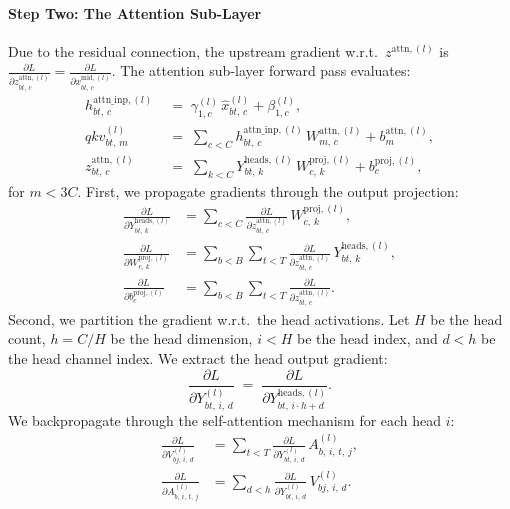 \documentclass[letterpaper, 10 pt, conference]{ieeeconf}
\newcommand{\pdv}[2]{\frac{\partial #1}{\partial #2}}
\newcommand{\dL}[1]{\pdv{L}{#1}}
\theoremstyle{definition}
\begin{document}
\paragraph{Step Two: The Attention Sub-Layer}
Due to the residual connection, the upstream gradient w.r.t.\ $z^{\text{attn}, (l)}$ is $\dL{z^{\text{attn}, (l)}_{bt,\, c}} = \dL{x^{\text{mid}, (l)}_{bt,\, c}}$. The attention sub-layer forward pass evaluates:
\begin{align}
  h^{\text{attn\_inp}, (l)}_{bt,\, c} \; & =\; \gamma^{(l)}_{1, c}\,\hat{x}^{(l)}_{bt,\, c} + \beta^{(l)}_{1, c},                                        \\
  qkv^{(l)}_{bt,\, m} \;                 & =\; \sum_{c<C} h^{\text{attn\_inp}, (l)}_{bt,\, c}\,W^{\text{attn}, (l)}_{m,\, c} + b^{\text{attn}, (l)}_{m}, \\
  z^{\text{attn}, (l)}_{bt,\, c} \;      & =\; \sum_{k<C} Y^{\text{heads}, (l)}_{bt,\, k}\,W^{\text{proj}, (l)}_{c,\, k} + b^{\text{proj}, (l)}_{c},
\end{align}
for $m < 3C$. First, we propagate gradients through the output projection:
\begin{align}
  \dL{Y^{\text{heads}, (l)}_{bt,\, k}}
   & = \sum_{c<C} \dL{z^{\text{attn}, (l)}_{bt,\, c}}\,W^{\text{proj}, (l)}_{c,\, k},
  \label{eq:full-dyheads}                                                                          \\
  \dL{W^{\text{proj}, (l)}_{c,\, k}}
   & = \sum_{b<B} \sum_{t<T} \dL{z^{\text{attn}, (l)}_{bt,\, c}}\,Y^{\text{heads}, (l)}_{bt,\, k},
  \label{eq:full-dwproj-attn}                                                                      \\
  \dL{b^{\text{proj}, (l)}_{c}}
   & = \sum_{b<B} \sum_{t<T} \dL{z^{\text{attn}, (l)}_{bt,\, c}}.
  \label{eq:full-dbproj-attn}
\end{align}
Second, we partition the gradient w.r.t.\ the head activations. Let $H$ be the head count, $h = C/H$ be the head dimension, $i < H$ be the head index, and $d < h$ be the head channel index. We extract the head output gradient:
\begin{equation}
  \dL{Y^{(l)}_{bt,\, i,\, d}} \;=\; \dL{Y^{\text{heads}, (l)}_{bt,\, i \cdot h + d}}.
\end{equation}
We backpropagate through the self-attention mechanism for each head $i$:
\begin{align}
  \dL{V^{(l)}_{bj,\, i,\, d}}
   & = \sum_{t<T} \dL{Y^{(l)}_{bt,\, i,\, d}}\,A^{(l)}_{b,\, i,\, t,\, j},
  \label{eq:full-dv}                                                       \\
  \dL{A^{(l)}_{b,\, i,\, t,\, j}}
   & = \sum_{d<h} \dL{Y^{(l)}_{bt,\, i,\, d}}\,V^{(l)}_{bj,\, i,\, d}.
  \label{eq:full-da-matrix}
\end{align}
\end{document}
